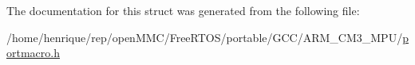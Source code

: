 The documentation for this struct was generated from the following file\-:\begin{DoxyCompactItemize}
\item 
/home/henrique/rep/open\-M\-M\-C/\-Free\-R\-T\-O\-S/portable/\-G\-C\-C/\-A\-R\-M\-\_\-\-C\-M3\-\_\-\-M\-P\-U/\hyperlink{GCC_2ARM__CM3__MPU_2portmacro_8h}{portmacro.\-h}\end{DoxyCompactItemize}
